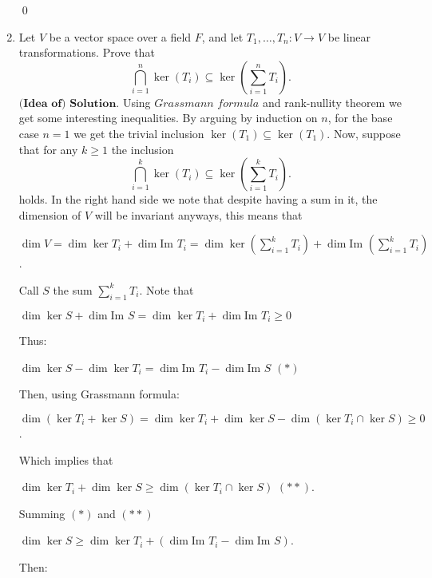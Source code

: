 \documentclass{article}
\theoremstyle{remark}
\begin{document}
\begin{enumerate}
        \begin{flushright}
            \qed
        \end{flushright}
        \item Let \( V \) be a vector space over a field \( F \), and let \( T_1, \dots, T_n: V \to V \) be linear transformations. Prove that 
        \[
        \bigcap_{i=1}^n \ker(T_i) \subseteq \ker\left(\sum_{i=1}^n T_i\right).
        \]
        $\textbf{(Idea of) Solution.}$ Using $Grassmann$ $formula$ and rank-nullity theorem we get some interesting inequalities.
        By arguing by induction on $n$, for the base case $n = 1$ we get the trivial inclusion
        $\ker (T_1) \subseteq \ker (T_1)$.
        Now, suppose that for any $k \geq 1$ the inclusion
        \[
            \bigcap_{i=1}^k \ker(T_i) \subseteq \ker\left(\sum_{i=1}^k T_i\right).
        \]
        holds. In the right hand side we note that despite having a sum in it, the dimension of $V$ will be invariant anyways,
        this means that
        \begin{center}
            $\displaystyle 
            \dim V = \dim \ker T_i + \dim \text{Im } T_i = \dim \ker\left(\sum_{i=1}^k T_i\right) + \dim \text{Im }\left( \sum_{i=1}^{k} T_i\right)$.
        \end{center}
        Call $S$ the sum $\sum_{i=1}^k T_i$. Note that
        \begin{center}
            $\dim \ker S + \dim \text{Im }S = \dim \ker T_i + \dim \text{Im } T_i \geq 0$
        \end{center}
        Thus:
        \begin{center}
            $\dim \ker S - \dim \ker T_i = \dim \text{Im } T_i - \dim \text{Im }S$ $(\ast)$
        \end{center}
        Then, using Grassmann formula:
        \begin{center}
            $\dim (\ker T_i + \ker S) = \dim \ker T_i + \dim \ker S - \dim (\ker T_i \cap \ker S) \geq 0$.
        \end{center}
        Which implies that
        \begin{center}
            $\dim \ker T_i + \dim \ker S \geq \dim (\ker T_i \cap \ker S)$ $(\ast \ast)$.
        \end{center}
        Summing $(\ast)$ and $(\ast \ast)$
        \begin{center}
            $\dim \ker S \geq \dim \ker T_i + (\dim \text{Im } T_i - \dim \text{Im } S)$.
        \end{center}
        Then:

\end{enumerate}
\end{document}
